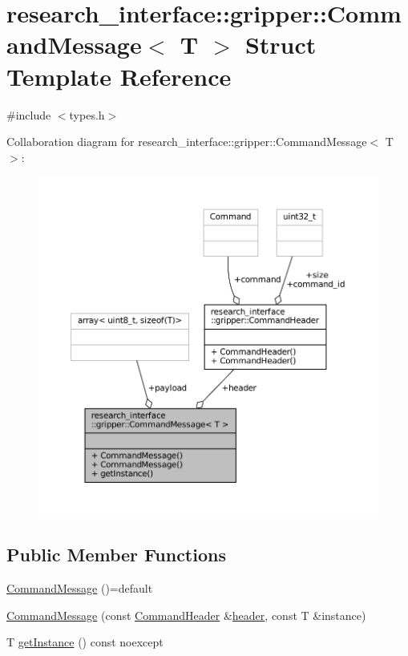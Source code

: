 \hypertarget{structresearch__interface_1_1gripper_1_1CommandMessage}{}\section{research\+\_\+interface\+:\+:gripper\+:\+:Command\+Message$<$ T $>$ Struct Template Reference}
\label{structresearch__interface_1_1gripper_1_1CommandMessage}


{\ttfamily \#include $<$types.\+h$>$}



Collaboration diagram for research\+\_\+interface\+:\+:gripper\+:\+:Command\+Message$<$ T $>$\+:
\nopagebreak
\begin{figure}[H]
\begin{center}
\leavevmode
\includegraphics[width=350pt]{structresearch__interface_1_1gripper_1_1CommandMessage__coll__graph}
\end{center}
\end{figure}
\subsection*{Public Member Functions}
\begin{DoxyCompactItemize}
\item 
\hyperlink{structresearch__interface_1_1gripper_1_1CommandMessage_ad72fdd9aedd7efefa2fa7038483a7511}{Command\+Message} ()=default
\item 
\hyperlink{structresearch__interface_1_1gripper_1_1CommandMessage_a0f24a8d2d62ec21c3a821a9949b119c1}{Command\+Message} (const \hyperlink{structresearch__interface_1_1gripper_1_1CommandHeader}{Command\+Header} \&\hyperlink{structresearch__interface_1_1gripper_1_1CommandMessage_ae32966ef012e8fc0355a775944a8cc55}{header}, const T \&instance)
\item 
T \hyperlink{structresearch__interface_1_1gripper_1_1CommandMessage_abe34d191f846a79fa53f6596e0a49ff1}{get\+Instance} () const noexcept
\end{DoxyCompactItemize}
